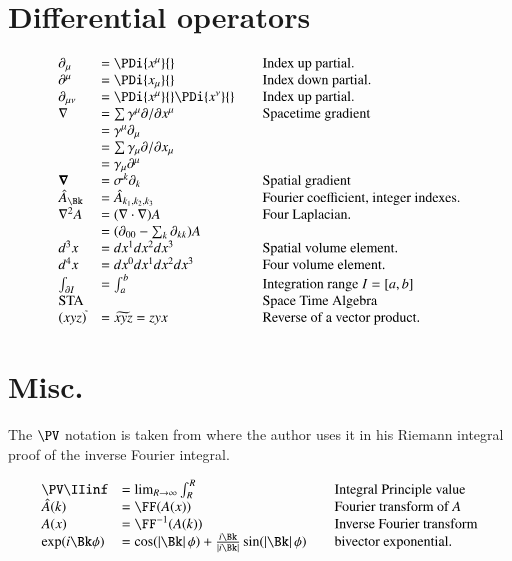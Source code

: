 \section{Differential operators}
\begin{equation*}
\begin{array}{l l l}
\partial_{\mu} &= \PDi{x^\mu}{} & \quad \mbox{Index up partial.} \\
\partial^{\mu} &= \PDi{x_\mu}{} & \quad \mbox{Index down partial.} \\
\partial_{\mu\nu} &= \PDi{x^\mu}{}\PDi{x^\nu}{} & \quad \mbox{Index up partial.} \\
\grad &= \sum \gamma^{\mu} \partial/\partial {x^{\mu}} & \quad \mbox{Spacetime gradient} \\
      &= \gamma^{\mu}\partial_{\mu} \\
      &= \sum \gamma_{\mu} \partial/\partial {x_{\mu}} \\
      &= \gamma_{\mu}\partial^{\mu} \\
\spacegrad &= \sigma^{k} \partial_k & \quad \mbox{Spatial gradient} \\
\hat{A}_{\Bk} &= \hat{A}_{k_1,k_2,k_3} & \quad \mbox{Fourier coefficient, integer indexes.} \\
\grad^2 A
   &= (\grad \cdot \grad) A & \quad \mbox{Four Laplacian. } \\
   &= (\partial_{00} - \sum_k \partial_{kk}) A & \\
d^3 x &= dx^1 dx^2 dx^3 & \quad \mbox{Spatial volume element. } \\
d^4 x &= dx^0 dx^1 dx^2 dx^3 & \quad \mbox{Four volume element. } \\
\int_{\partial I} &= \int_{a}^{b} & \quad \mbox{Integration range $I = [a,b]$ } \\
\text{STA} & & \quad \mbox{Space Time Algebra} \\
(xyz)^{\tilde{}} &= \widetilde{xyz} = z y x & \quad \mbox{Reverse of a vector product.} \\
\end{array}
\end{equation*}

\section{Misc.}

The $\PV$ notation is taken from \cite{lepage1980cva} where the author uses it in his Riemann integral proof of the inverse Fourier integral.

\begin{equation*}
\begin{array}{l l l}
\PV \IIinf &= \lim_{R\rightarrow \infty} \int_{R}^R & \quad \mbox{Integral Principle value} \\
\hat{A}(k) &= \FF(A(x)) & \quad \mbox{Fourier transform of $A$} \\
{A}(x) &= \FF^{-1}(A(k)) & \quad \mbox{Inverse Fourier transform} \\
\exp(i\Bk\phi) &=
\cos(\Abs{\Bk}\phi) + \frac{i \Bk}{\Abs{i\Bk}} \sin(\Abs{\Bk}\phi) & \quad \mbox{bivector exponential. } \\
\end{array}
\end{equation*}
